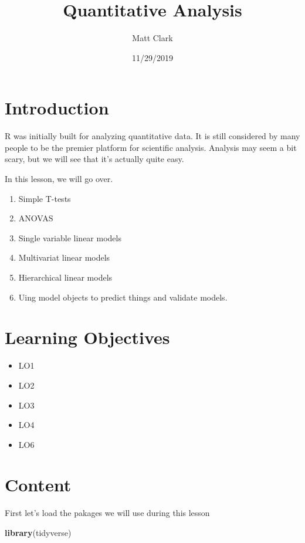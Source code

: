\documentclass[
]{article}
\title{Quantitative Analysis}
\author{Matt Clark}
\date{11/29/2019}
\newenvironment{Shaded}{\begin{snugshade}}{\end{snugshade}}
\newcommand{\KeywordTok}[1]{\textcolor[rgb]{0.13,0.29,0.53}{\textbf{#1}}}
\newcommand{\NormalTok}[1]{#1}
\providecommand{\tightlist}{%
  \setlength{\itemsep}{0pt}\setlength{\parskip}{0pt}}
\begin{document}
\maketitle

\hypertarget{introduction}{%
\section{Introduction}\label{introduction}}

R was initially built for analyzing quantitative data. It is still
considered by many people to be the premier platform for scientific
analysis. Analysis may seem a bit scary, but we will see that it's
actually quite easy.

In this lesson, we will go over.

\begin{enumerate}
\def\labelenumi{\arabic{enumi}.}
\tightlist
\item
  Simple T-tests
\item
  ANOVAS
\item
  Single variable linear models
\item
  Multivariat linear models
\item
  Hierarchical linear models
\item
  Uing model objects to predict things and validate models.
\end{enumerate}

\hypertarget{learning-objectives}{%
\section{Learning Objectives}\label{learning-objectives}}

\begin{itemize}
\tightlist
\item
  LO1
\item
  LO2
\item
  LO3
\item
  LO4
\item
  LO6
\end{itemize}

\hypertarget{content}{%
\section{Content}\label{content}}

First let's load the pakages we will use during this lesson

\begin{Shaded}
\begin{Highlighting}[]
\KeywordTok{library}\NormalTok{(tidyverse)}
\end{Highlighting}
\end{Shaded}
\end{document}
